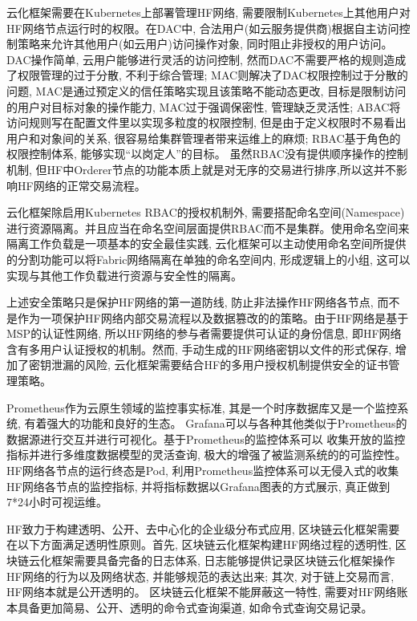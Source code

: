 云化框架需要在Kubernetes上部署管理HF网络, 需要限制Kubernetes上其他用户对HF网络节点运行时的权限。在DAC中, 合法用户(如云服务提供商)根据自主访问控制策略来允许其他用户(如云用户)访问操作对象\cite{lopez2018access}, 同时阻止非授权的用户访问。DAC操作简单, 云用户能够进行灵活的访问控制, 然而DAC不需要严格的规则造成了权限管理的过于分散, 不利于综合管理; MAC则解决了DAC权限控制过于分散的问题, MAC是通过预定义的信任策略实现且该策略不能动态更改, 目标是限制访问的用户对目标对象的操作能力, MAC过于强调保密性, 管理缺乏灵活性; ABAC将访问规则写在配置文件里以实现多粒度的权限控制, 但是由于定义权限时不易看出用户和对象间的关系, 很容易给集群管理者带来运维上的麻烦; RBAC基于角色的权限控制体系, 能够实现“以岗定人”的目标。 虽然RBAC没有提供顺序操作的控制机制, 但HF中Orderer节点的功能本质上就是对无序的交易进行排序,所以这并不影响HF网络的正常交易流程。

云化框架除启用Kubernetes RBAC的授权机制外, 需要搭配命名空间(Namespace)进行资源隔离。并且应当在命名空间层面提供RBAC而不是集群。使用命名空间来隔离工作负载是一项基本的安全最佳实践, 云化框架可以主动使用命名空间所提供的分割功能可以将Fabric网络隔离在单独的命名空间内, 形成逻辑上的小组, 这可以实现与其他工作负载进行资源与安全性的隔离。

上述安全策略只是保护HF网络的第一道防线, 防止非法操作HF网络各节点, 而不是作为一项保护HF网络内部交易流程以及数据篡改的的策略。由于HF网络是基于MSP的认证性网络, 所以HF网络的参与者需要提供可认证的身份信息, 即HF网络含有多用户认证授权的机制。然而, 手动生成的HF网络密钥以文件的形式保存, 增加了密钥泄漏的风险, 云化框架需要结合HF的多用户授权机制提供安全的证书管理策略。

Prometheus\cite{sukhija2019towards}作为云原生领域的监控事实标准, 其是一个时序数据库又是一个监控系统, 有着强大的功能和良好的生态。
Grafana可以与各种其他类似于Prometheus的数据源进行交互并进行可视化。基于Prometheus的监控体系可以
收集开放的监控指标并进行多维度数据模型的灵活查询, 极大的增强了被监测系统的的可监控性。HF网络各节点的运行终态是Pod, 利用Prometheus监控体系可以无侵入式的收集HF网络各节点的监控指标, 并将指标数据以Grafana图表的方式展示, 真正做到7*24小时可视运维。

HF致力于构建透明、公开、去中心化的企业级分布式应用, 区块链云化框架需要在以下方面满足透明性原则。首先, 区块链云化框架构建HF网络过程的透明性, 区块链云化框架需要具备完备的日志体系, 日志能够提供记录区块链云化框架操作HF网络的行为以及网络状态, 并能够规范的表达出来; 其次, 对于链上交易而言, HF网络本就是公开透明的。 区块链云化框架不能屏蔽这一特性, 需要对HF网络账本具备更加简易、公开、透明的命令式查询渠道, 如命令式查询交易记录。

